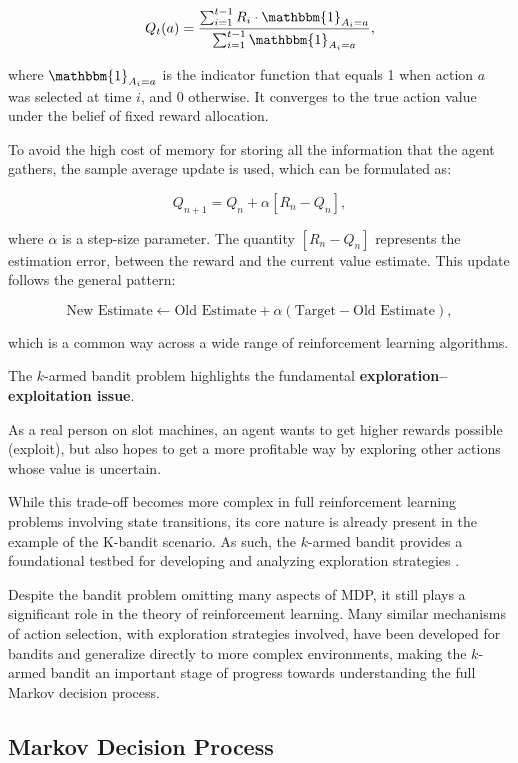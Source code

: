 \[
Q_t(a) = \frac{\sum_{i=1}^{t-1} R_i \cdot \mathbbm{1}_{A_i=a}}{\sum_{i=1}^{t-1} \mathbbm{1}_{A_i=a}},
\]

where $\mathbbm{1}_{A_i=a}$ is the indicator function that equals 1 when action $a$ was selected at time $i$, and 0 otherwise. It converges to the true action value under the belief of fixed reward allocation.

To avoid the high cost of memory for storing all the information that the agent gathers, the sample average update is used, which can be formulated as:

\[
Q_{n+1} = Q_n + \alpha \left[ R_n - Q_n \right],
\]

where $\alpha$ is a step-size parameter. The quantity $[R_n - Q_n]$ represents the estimation error,  between the reward and the current value estimate. This update follows the general pattern:

\[
\text{New Estimate} \leftarrow \text{Old Estimate} + \alpha (\text{Target} - \text{Old Estimate}),
\]

which is a common way across a wide range of reinforcement learning algorithms.

The $k$-armed bandit problem highlights the fundamental \textbf{exploration--exploitation issue}. 

As a real person on slot machines, an agent wants to get higher rewards possible (exploit), but also hopes to get a more profitable way by exploring other actions whose value is uncertain.

While this trade-off becomes more complex in full reinforcement learning problems involving state transitions, its core nature is already present in the example of the K-bandit scenario. As such, the $k$-armed bandit provides a foundational testbed for developing and analyzing exploration strategies \cite{burnetas1997}.


Despite the bandit problem omitting many aspects of MDP, it still plays a significant role in the theory of reinforcement learning. Many similar mechanisms of action selection, with exploration strategies involved, have been developed for bandits and generalize directly to more complex environments, making the $k$-armed bandit an important stage of progress towards understanding the full Markov decision process.


\subsection{Markov Decision Process}

